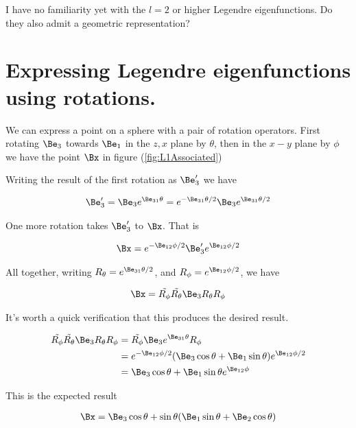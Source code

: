 I have no familiarity yet with the $l=2$ or higher Legendre eigenfunctions.  Do they also admit a geometric representation?

\section{Expressing Legendre eigenfunctions using rotations.}

We can express a point on a sphere with a pair of rotation operators.  First rotating $\Be_3$ towards $\Be_1$ in the $z,x$ plane by $\theta$, then in the $x-y$ plane by $\phi$ we have the point $\Bx$ in figure (\ref{fig:L1Associated})

Writing the result of the first rotation as $\Be_3'$ we have

\begin{align}\label{eqn:foob1}
\Be_3' = \Be_3 e^{\Be_{31}\theta} = e^{-\Be_{31}\theta/2} \Be_3 e^{\Be_{31}\theta/2} 
\end{align}

One more rotation takes $\Be_3'$ to $\Bx$.  That is

\begin{align}\label{eqn:foob2}
\Bx = e^{-\Be_{12}\phi/2} \Be_3' e^{\Be_{12}\phi/2} 
\end{align}

All together, writing $R_\theta = e^{\Be_{31}\theta/2}$, and $R_\phi = e^{\Be_{12}\phi/2}$, we have

\begin{align}\label{eqn:foob3}
\Bx = \tilde{R_\phi} \tilde{R_\theta} \Be_3 R_\theta R_\phi
\end{align}

It's worth a quick verification that this produces the desired result.

\begin{align*}
\tilde{R_\phi} \tilde{R_\theta} \Be_3 R_\theta R_\phi 
&= \tilde{R_\phi} \Be_3 e^{\Be_{31}\theta} R_\phi \\
&= e^{-\Be_{12}\phi/2} (\Be_3 \cos\theta + \Be_1 \sin\theta) e^{\Be_{12}\phi/2} \\
&= 
\Be_3 \cos\theta + \Be_1 \sin\theta e^{\Be_{12}\phi} \\
\end{align*}

This is the expected result

\begin{align}\label{eqn:foob4}
\Bx = \Be_3 \cos\theta + \sin\theta (\Be_1 \sin\theta + \Be_2 \cos\theta) 
\end{align}

